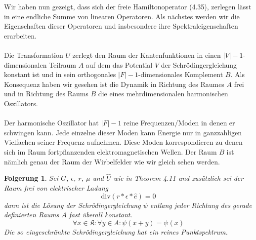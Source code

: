 \documentclass[11pt,a4paper,leqno]{report}
\newtheorem{corollary}[theorem]{Folgerung}
\numberwithin{equation}{chapter}
\begin{document}
\noindent
Wir haben nun gezeigt, dass sich der freie Hamiltonoperator (4.35), zerlegen l\"asst in eine endliche Summe von linearen Operatoren. Als n\"achstes werden wir die Eigenschaften dieser Operatoren und insbesondere ihre Spektraleigenschaften erarbeiten.
\\
\\
Die Transformation $U$ zerlegt den Raum der Kantenfunktionen in einen $|V| - 1$-dimensionalen Teilraum $A$ auf dem das Potential $V$ der Schr\"odingergleichung konstant ist und in sein orthogonales $|F| - 1$-dimensionales Komplement $B$. Als Konsequenz haben wir gesehen ist die Dynamik in Richtung des Raumes $A$ frei und in Richtung des Raums $B$ die eines mehrdimensionalen harmonischen Oszillators.\\
\\
Der harmonische Oszillator hat $|F| - 1$ reine Frequenzen/Moden in denen er schwingen kann. Jede einzelne dieser Moden kann Energie nur in ganzzahligen Vielfachen seiner Frequenz aufnehmen. Diese Moden korrespondieren zu denen sich im Raum fortpflanzenden elektromagnetischen Wellen. Der Raum $B$ ist n\"amlich genau der Raum der Wirbelfelder wie wir gleich sehen werden.
\begin{corollary}
	Sei $G$, $\epsilon$, $r$, $\mu$ und $\hat{U}$ wie in Theorem 4.11 und zus\"atzlich sei der Raum frei von elektrischer Ladung
	\begin{equation}
		\text{div}(r * \epsilon * \hat{e}) = 0
	\end{equation}
	dann ist die L\"osung der Schr\"odingergleichung $\psi$ entlang jeder Richtung des gerade definierten Raums $A$  fast \"uberall konstant.
	\begin{equation}
		\forall x\in \mathfrak{K}:\forall y\in A: \psi(x+y)=\psi(x)
	\end{equation}
	Die so eingeschr\"ankte Schr\"odingergleichung hat ein reines Punktspektrum.
\end{corollary} 
\end{document}
